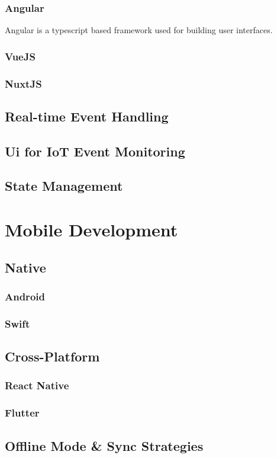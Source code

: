\subsubsection{Angular}
Angular is a typescript based framework used for building user interfaces.

\subsubsection{VueJS}

\subsubsection{NuxtJS}

\subsection{Real-time Event Handling}

\subsection{Ui for IoT Event Monitoring}

\subsection{State Management}

\section{Mobile Development}

\subsection{Native}
\subsubsection{Android}
\subsubsection{Swift}

\subsection{Cross-Platform}
\subsubsection{React Native}
\subsubsection{Flutter}

\subsection{Offline Mode \& Sync Strategies}

